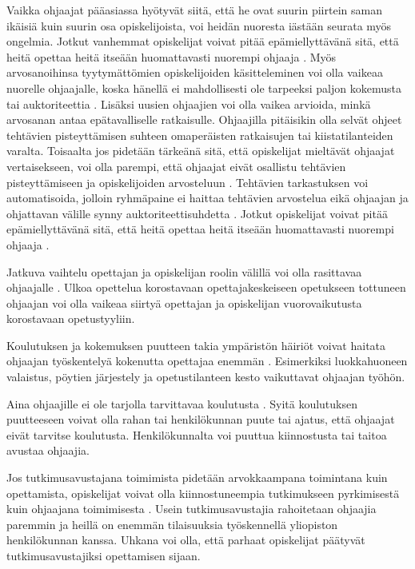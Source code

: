 \documentclass[finnish]{tktltiki2}
\theoremstyle{definition}
\theoremstyle{remark}
\begin{document}
Vaikka ohjaajat pääasiassa hyötyvät siitä, että he ovat suurin piirtein saman ikäisiä kuin suurin osa opiskelijoista, voi heidän nuoresta iästään seurata myös ongelmia. Jotkut vanhemmat opiskelijat voivat pitää epämiellyttävänä sitä, että heitä opettaa heitä itseään huomattavasti nuorempi ohjaaja \cite{Sperry08}. Myös arvosanoihinsa tyytymättömien opiskelijoiden käsitteleminen voi olla vaikeaa nuorelle ohjaajalle, koska hänellä ei mahdollisesti ole tarpeeksi paljon kokemusta tai auktoriteettia \cite{Roberts95}. Lisäksi uusien ohjaajien voi olla vaikea arvioida, minkä arvosanan antaa epätavalliselle ratkaisulle. Ohjaajilla pitäisikin olla selvät ohjeet tehtävien pisteyttämisen suhteen omaperäisten ratkaisujen tai kiistatilanteiden varalta. Toisaalta jos pidetään tärkeänä sitä, että opiskelijat mieltävät ohjaajat vertaisekseen, voi olla parempi, että ohjaajat eivät osallistu tehtävien pisteyttämiseen ja opiskelijoiden arvosteluun \cite{Morgan02}. Tehtävien tarkastuksen voi automatisoida, jolloin ryhmäpaine ei haittaa tehtävien arvostelua eikä ohjaajan ja ohjattavan välille synny auktoriteettisuhdetta \cite{Vihavainen}. Jotkut opiskelijat voivat pitää epämiellyttävänä sitä, että heitä opettaa heitä itseään huomattavasti nuorempi ohjaaja \cite{Sperry08}. \par

Jatkuva vaihtelu opettajan ja opiskelijan roolin välillä voi olla rasittavaa ohjaajalle \cite{Mark11}. Ulkoa opettelua korostavaan opettajakeskeiseen opetukseen tottuneen ohjaajan voi olla vaikeaa siirtyä opettajan ja opiskelijan vuorovaikutusta korostavaan opetustyyliin. \par

Koulutuksen ja kokemuksen puutteen takia ympäristön häiriöt voivat haitata ohjaajan työskentelyä kokenutta opettajaa enemmän \cite{Patitsas12_3}. Esimerkiksi luokkahuoneen valaistus, pöytien järjestely ja opetustilanteen kesto vaikuttavat ohjaajan työhön. \par

Aina ohjaajille ei ole tarjolla tarvittavaa koulutusta \cite{Shannon98}. Syitä koulutuksen puutteeseen voivat olla rahan tai henkilökunnan puute tai ajatus, että ohjaajat eivät tarvitse koulutusta. Henkilökunnalta voi puuttua kiinnostusta tai taitoa avustaa ohjaajia. \par

Jos tutkimusavustajana toimimista pidetään arvokkaampana toimintana kuin opettamista, opiskelijat voivat olla kiinnostuneempia tutkimukseen pyrkimisestä kuin ohjaajana toimimisesta \cite{Shannon98}. Usein tutkimusavustajia rahoitetaan ohjaajia paremmin ja heillä on enemmän tilaisuuksia työskennellä yliopiston henkilökunnan kanssa. Uhkana voi olla, että parhaat opiskelijat päätyvät tutkimusavustajiksi opettamisen sijaan. \par
\end{document}

